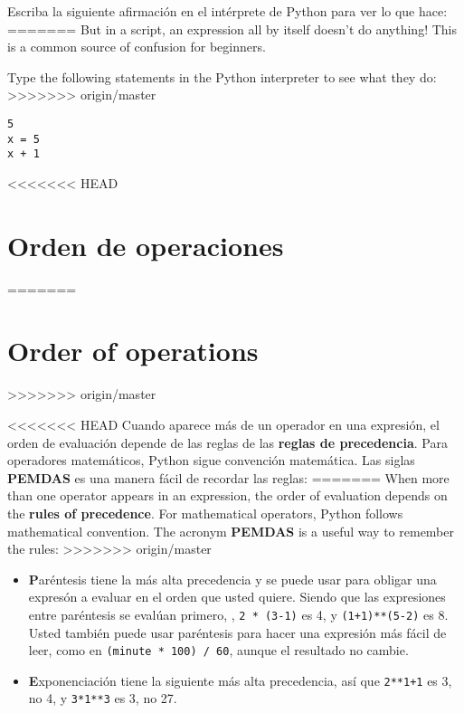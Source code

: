 \begin{ex}
Escriba la siguiente afirmaci\'on en el int\'erprete de Python para ver lo que hace:
=======
But in a script, an expression all by itself doesn't
do anything!  This is a common
source of confusion for beginners.

\begin{ex}
Type the following statements in the Python interpreter to see
what they do:
>>>>>>> origin/master

\beforeverb
\begin{verbatim}
5
x = 5
x + 1
\end{verbatim}
\afterverb
%
\end{ex}


<<<<<<< HEAD
\section{Orden de operaciones}
=======
\section{Order of operations}
>>>>>>> origin/master

<<<<<<< HEAD
Cuando aparece m\'as de un operador en una expresi\'on, el orden de evaluaci\'on depende de las reglas de las {\bf reglas de precedencia}.  Para operadores matem\'aticos, Python sigue convenci\'on matem\'atica.
Las siglas {\bf PEMDAS} es una manera f\'acil de recordar las reglas:
=======
When more than one operator appears in an expression, the order of
evaluation depends on the {\bf rules of precedence}.  For
mathematical operators, Python follows mathematical convention.
The acronym {\bf PEMDAS} is a useful way to
remember the rules:
>>>>>>> origin/master


\begin{itemize}

<<<<<<< HEAD
\item {\bf P}ar\'entesis tiene la m\'as alta precedencia y se puede usar para obligar una expres\'on a evaluar en el orden que usted quiere. Siendo que las expresiones entre par\'entesis se eval\'uan primero, , {\tt 2 * (3-1)} es 4,
y {\tt (1+1)**(5-2)} es 8. Usted tambi\'en puede usar par\'entesis para hacer una expresi\'on m\'as f\'acil de leer, como en  {\tt (minute * 100) / 60}, aunque el resultado no cambie.

\item {\bf E}xponenciaci\'on tiene la siguiente m\'as alta precedencia, as\'i que 
{\tt 2**1+1} es 3, no 4, y {\tt 3*1**3} es 3, no 27.


\end{itemize}
\end{ex}
